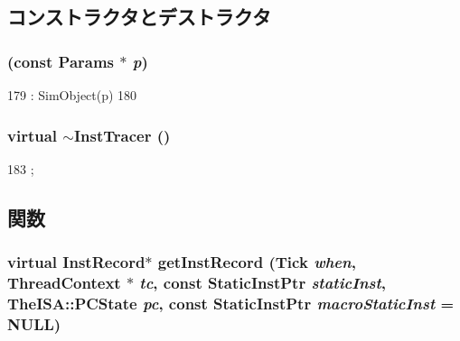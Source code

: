 \subsection{コンストラクタとデストラクタ}
\hypertarget{classTrace_1_1InstTracer_a7c3b316fe172f5cded790583ca25852c}{
\subsubsection[{InstTracer}]{ (const {\bf Params} $\ast$ {\em p})}}
\label{classTrace_1_1InstTracer_a7c3b316fe172f5cded790583ca25852c}



\begin{DoxyCode}
179                                 : SimObject(p)
180     {}
\end{DoxyCode}
\hypertarget{classTrace_1_1InstTracer_a2cbf63eb075ece4bf1250efeced23231}{
\subsubsection[{$\sim$InstTracer}]{\setlength{\rightskip}{0pt plus 5cm}virtual $\sim${\bf InstTracer} ()}}
\label{classTrace_1_1InstTracer_a2cbf63eb075ece4bf1250efeced23231}



\begin{DoxyCode}
183     {};
\end{DoxyCode}


\subsection{関数}
\hypertarget{classTrace_1_1InstTracer_a4891aa2e596bcb475928d8fe1766a9df}{
\subsubsection[{getInstRecord}]{\setlength{\rightskip}{0pt plus 5cm}virtual {\bf InstRecord}$\ast$ getInstRecord ({\bf Tick} {\em when}, \/  {\bf ThreadContext} $\ast$ {\em tc}, \/  const {\bf StaticInstPtr} {\em staticInst}, \/  TheISA::PCState {\em pc}, \/  const {\bf StaticInstPtr} {\em macroStaticInst} = {\ttfamily NULL})}}
\label{classTrace_1_1InstTracer_a4891aa2e596bcb475928d8fe1766a9df}


